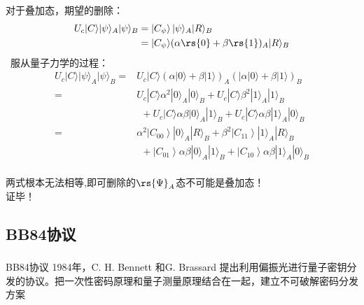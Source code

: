 \begin{frame}
    \frametitle{}
    对于叠加态，期望的删除：
    \[\begin{aligned}
        U_{c}|C\rangle|\psi\rangle_{A}|\psi\rangle_{B}&=\left|C_{\psi}\right\rangle|\psi\rangle_{A}|R\rangle_{B} \\
        &=|C_{\psi}\rangle(\alpha\rs{0}+\beta\rs{1})_{A}|R\rangle_{B} 
        \end{aligned} 
    \]
     服从量子力学的过程：
    \[ \begin{aligned}
        U_{c}|C\rangle|\psi\rangle_{A}|\psi\rangle_{B}=&U_{c}|C\rangle(\alpha|0\rangle+\beta|1\rangle)_{A}(|\alpha| 0\rangle+\beta|1\rangle)_{B} \\
        =& U_{c}|C\rangle \alpha^{2}|0\rangle_{A}|0\rangle_{B}+U_{c}|C\rangle \beta^{2}|1\rangle_{A}|1\rangle_{B} \\
        &~~+U_{c}|C\rangle \alpha \beta|0\rangle_{A}|1\rangle_{B}+U_{c}|C\rangle \alpha \beta|1\rangle_{A}|0\rangle_{B} \\
        =& \alpha^{2}\left|C_{00}\right\rangle|0\rangle_{A}|R\rangle_{B}+\beta^{2}\left|C_{11}\right\rangle|1\rangle_{A}|R\rangle_{B} \\
        &~~+\left|C_{01}\right\rangle \alpha \beta|0\rangle_{A}|1\rangle_{B}+\left|C_{10}\right\rangle \alpha \beta|1\rangle_{A}|0\rangle_{B}
        \end{aligned}
    \]
    ~~\\
    两式根本无法相等,即可删除的$\rs{\Psi}_A$态不可能是叠加态！\\
    证毕！          
\end{frame}

\subsection{BB84协议}
\begin{frame}
    \frametitle{}
    \begin{tcolorbox2}{BB84协议}
    {1984年，C. H. Bennett 和G. Brassard 提出利用偏振光进行量子密钥分发的协议。把一次性密码原理和量子测量原理结合在一起，建立不可破解密码分发方案}
    \end{tcolorbox2}  
\end{frame}

